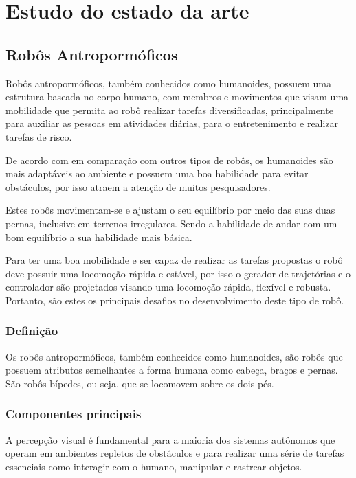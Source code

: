 \chapter{Estudo do estado da arte}
\label{chap:sota}

\section{Robôs Antropormóficos}
\label{ssec:robos}

Robôs antropormóficos, também conhecidos como humanoides, possuem uma estrutura baseada no corpo humano, com  membros e movimentos que visam uma mobilidade que permita ao robô realizar tarefas diversificadas, principalmente para auxiliar as pessoas em atividades diárias, para o entretenimento e realizar tarefas de risco.

De acordo com  em comparação com outros tipos de robôs, os humanoides são mais adaptáveis ao ambiente e possuem uma boa habilidade para evitar obstáculos, por isso atraem a atenção de muitos pesquisadores.

Estes robôs movimentam-se e ajustam o seu equilíbrio por meio das suas duas pernas, inclusive em terrenos irregulares. Sendo a habilidade de andar com um bom equilíbrio a sua habilidade mais básica.

Para ter uma boa mobilidade e ser capaz de realizar as tarefas propostas o robô deve possuir uma locomoção rápida e estável, por isso o gerador de trajetórias e o controlador são projetados visando uma locomoção rápida, flexível e robusta. Portanto, são estes os principais desafios no desenvolvimento deste tipo de robô.



\subsection{Definição}
\label{ssec:defi}

Os robôs antropormóficos, também conhecidos como humanoides, são robôs que possuem atributos semelhantes a forma humana como cabeça, braços e pernas. São robôs bípedes, ou seja, que se locomovem sobre os dois pés.

\subsection{Componentes principais}
\label{ssec:comp}

A percepção visual é fundamental para a maioria dos sistemas autônomos que operam em ambientes repletos de obstáculos e para realizar uma série de tarefas essenciais como interagir com o humano, manipular e rastrear objetos. \cite{Joseph2018} 

